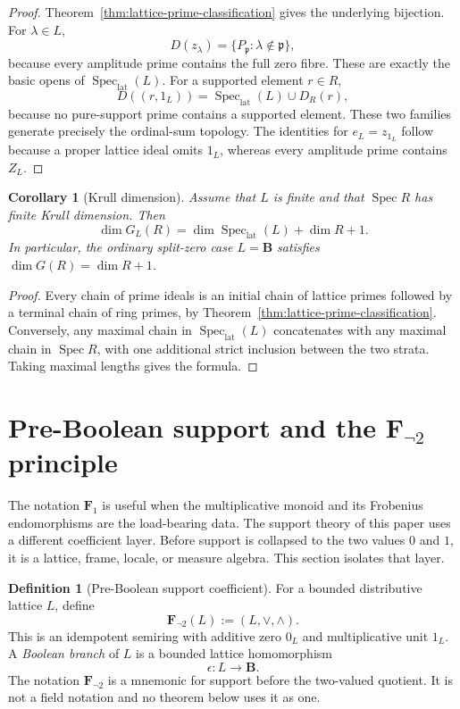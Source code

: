 \documentclass[11pt]{amsart}
\numberwithin{equation}{section}
\newtheorem{corollary}[theorem]{Corollary}
\theoremstyle{definition}
\newtheorem{definition}[theorem]{Definition}
\newcommand{\B}{\mathbf B}
\newcommand{\Fone}{\mathbf F_1}
\newcommand{\Fnot}{\mathbf F_{\neg 2}}
\newcommand{\Spec}{\operatorname{Spec}}
\newcommand{\SpecLat}{\operatorname{Spec}_{\mathrm{lat}}}
\begin{document}
\begin{proof}
Theorem~\ref{thm:lattice-prime-classification} gives the underlying
bijection.  For $\lambda\in L$,
\[
D(z_\lambda)
=\{P_{\mathfrak p}:\lambda\notin\mathfrak p\},
\]
because every amplitude prime contains the full zero fibre.  These are
exactly the basic opens of $\SpecLat(L)$.  For a supported element
$r\in R$,
\[
D((r,1_L))
=\SpecLat(L)\cup D_R(r),
\]
because no pure-support prime contains a supported element.  These two
families generate precisely the ordinal-sum topology.  The identities for
$e_L=z_{1_L}$ follow because a proper lattice ideal omits $1_L$, whereas
every amplitude prime contains $Z_L$.
\end{proof}

\begin{corollary}[Krull dimension]
\label{cor:lattice-split-dimension}
Assume that $L$ is finite and that $\Spec R$ has finite Krull dimension.
Then
\[
\boxed{
\dim G_L(R)=\dim\SpecLat(L)+\dim R+1.
}
\]
In particular, the ordinary split-zero case $L=\B$ satisfies
$\dim G(R)=\dim R+1$.
\end{corollary}

\begin{proof}
Every chain of prime ideals is an initial chain of lattice primes followed
by a terminal chain of ring primes, by
Theorem~\ref{thm:lattice-prime-classification}.  Conversely, any maximal
chain in $\SpecLat(L)$ concatenates with any maximal chain in $\Spec R$,
with one additional strict inclusion between the two strata.  Taking
maximal lengths gives the formula.
\end{proof}


\section{Pre-Boolean support and the \texorpdfstring{$\Fnot$}{F-not-2} principle}
\label{sec:fnot2-principle}

The notation $\Fone$ is useful when the multiplicative monoid and its
Frobenius endomorphisms are the load-bearing data.  The support theory of
this paper uses a different coefficient layer.  Before support is
collapsed to the two values $0$ and $1$, it is a lattice, frame, locale, or
measure algebra.  This section isolates that layer.

\begin{definition}[Pre-Boolean support coefficient]
\label{def:fnot2-coefficient}
For a bounded distributive lattice $L$, define
\[
\boxed{\Fnot(L):=(L,\vee,\wedge).}
\]
This is an idempotent semiring with additive zero $0_L$ and multiplicative
unit $1_L$.  A \emph{Boolean branch} of $L$ is a bounded lattice
homomorphism
\[
\epsilon:L\longrightarrow\B.
\]
The notation $\Fnot$ is a mnemonic for support before the two-valued
quotient.  It is not a field notation and no theorem below uses it as one.
\end{definition}
\end{document}
